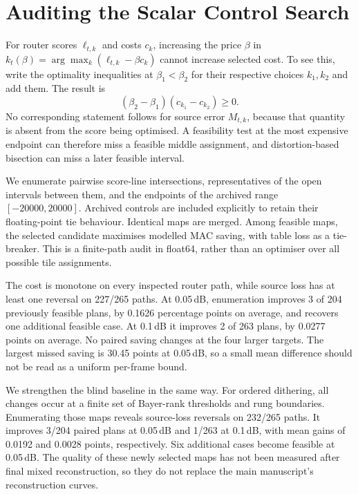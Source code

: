 \section{Auditing the Scalar Control Search}

For router scores $\ell_{t,k}$ and costs $c_k$, increasing the price $\beta$
in $k_t(\beta)=\arg\max_k(\ell_{t,k}-\beta c_k)$ cannot increase selected cost.
To see this, write the optimality inequalities at $\beta_1<\beta_2$ for
their respective choices $k_1,k_2$ and add them. The result is
\begin{equation}
 (\beta_2-\beta_1)(c_{k_1}-c_{k_2})\geq 0.
\end{equation}
No corresponding statement follows for source error $M_{t,k}$, because that
quantity is absent from the score being optimised. A feasibility test at the
most expensive endpoint can therefore miss a feasible middle assignment,
and distortion-based bisection can miss a later feasible interval.

We enumerate pairwise score-line intersections, representatives of the open
intervals between them, and the endpoints of the archived range
$[-20000,20000]$. Archived controls are included explicitly to retain their
floating-point tie behaviour. Identical maps are merged. Among feasible
maps, the selected candidate maximises modelled MAC saving, with table loss
as a tie-breaker. This is a finite-path audit in float64, rather than an
optimiser over all possible tile assignments.

The cost is monotone on every inspected router path, while source loss has
at least one reversal on 227/265 paths. At 0.05\,dB, enumeration improves
3 of 204 previously feasible plans, by 0.1626 percentage points on average,
and recovers one additional feasible case. At 0.1\,dB it improves 2 of 263
plans, by 0.0277 points on average. No paired saving changes at the four
larger targets. The largest missed saving is 30.45 points at 0.05\,dB, so a
small mean difference should not be read as a uniform per-frame bound.

We strengthen the blind baseline in the same way. For ordered dithering,
all changes occur at a finite set of Bayer-rank thresholds and rung
boundaries. Enumerating those maps reveals source-loss reversals on 232/265
paths. It improves 3/204 paired plans at 0.05\,dB and 1/263 at 0.1\,dB,
with mean gains of 0.0192 and 0.0028 points, respectively. Six additional
cases become feasible at 0.05\,dB. The quality of these newly selected maps
has not been measured after final mixed reconstruction, so they do not
replace the main manuscript's reconstruction curves.

